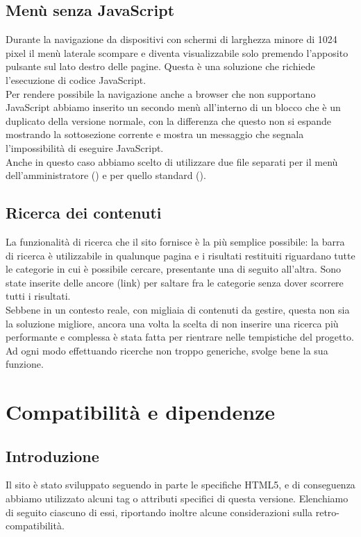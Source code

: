 \documentclass[12pt]{article}
\begin{document}
	\subsection{Menù senza JavaScript} \label{ssec:menusenzajs}
	Durante la navigazione da dispositivi con schermi di larghezza minore di 1024 pixel il menù laterale scompare e diventa visualizzabile solo premendo l'apposito pulsante sul lato destro delle pagine. Questa è una soluzione che richiede l'esecuzione di codice JavaScript.\\Per rendere possibile la navigazione anche a browser che non supportano JavaScript abbiamo inserito un secondo menù all'interno di un blocco  che è un duplicato della versione normale, con la differenza che questo non si espande mostrando la sottosezione corrente e mostra un messaggio che segnala l'impossibilità di eseguire JavaScript.\\
	Anche in questo caso abbiamo scelto di utilizzare due file separati per il menù dell'amministratore () e per quello standard (). 
	
	\subsection{Ricerca dei contenuti}
	La funzionalità di ricerca che il sito fornisce è la più semplice possibile: la barra di ricerca è utilizzabile in qualunque pagina e i risultati restituiti riguardano tutte le categorie in cui è possibile cercare, presentante una di seguito all'altra. Sono state inserite delle ancore (link) per saltare fra le categorie senza dover scorrere tutti i risultati.\\Sebbene in un contesto reale, con migliaia di contenuti da gestire, questa non sia la soluzione migliore, ancora una volta la scelta di non inserire una ricerca più performante e complessa è stata fatta per rientrare nelle tempistiche del progetto. Ad ogni modo effettuando ricerche non troppo generiche, svolge bene la sua funzione.
	
	\section{Compatibilità e dipendenze}
	\subsection{Introduzione}
	Il sito è stato sviluppato seguendo in parte le specifiche HTML5, e di conseguenza abbiamo utilizzato alcuni tag o attributi specifici di questa versione. Elenchiamo di seguito ciascuno di essi, riportando inoltre alcune considerazioni sulla retro-compatibilità.
	
\end{document}
